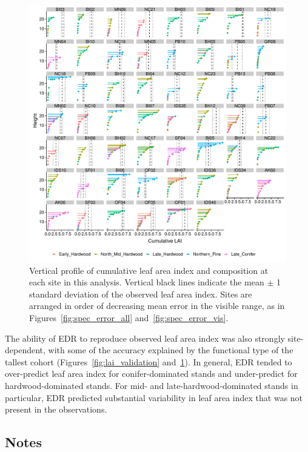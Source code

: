 \begin{figure}
  \centering
  \includegraphics[width=\textwidth]{4_edr/figures/explore_spectra/ed_cumlai_plot.pdf}
  \caption{%
    Vertical profile of cumulative leaf area index and composition at each site in this analysis.
    Vertical black lines indicate the mean $\pm$ 1 standard deviation of the observed leaf area index.
    Sites are arranged in order of decreasing mean error in the visible range, as in Figures~\ref{fig:spec_error_all} and~\ref{fig:spec_error_vis}.
  }\label{fig:lai_profile}
\end{figure}

The ability of EDR to reproduce observed leaf area index was also strongly site-dependent, with some of the accuracy explained by the functional type of the tallest cohort (Figures~\ref{fig:lai_validation} and~\ref{fig:lai_profile}).
In general, EDR tended to over-predict leaf area index for conifer-dominated stands and under-predict for hardwood-dominated stands.
For mid- and late-hardwood-dominated stands in particular, EDR predicted substantial variability in leaf area index that was not present in the observations.

\subsection{Notes}

